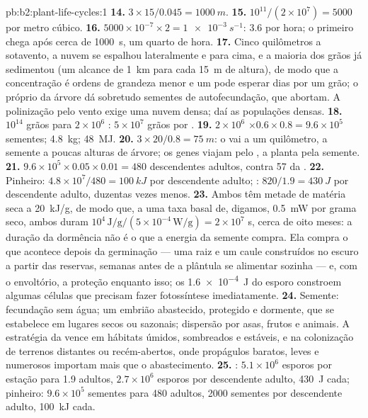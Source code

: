 \begin{solution}{pb:b2:plant-life-cycles:1}
\textbf{14.} $3\times 15/0.045 = \qty{1000}{m}$.
\textbf{15.} $10^{11}/(2\times 10^{7}) = \num{5000}$ por metro cúbico.
\textbf{16.} $5000\times 10^{-7}\times 2 = \qty{1e-3}{s^{-1}}$: 3.6 por
hora; o primeiro chega após cerca de \qty{1000}{s}, um quarto de hora.
\textbf{17.} Cinco quilômetros a sotavento, a nuvem se espalhou
lateralmente e para cima, e a maioria dos grãos já sedimentou (um
alcance de \qty{1}{km} para cada \qty{15}{m} de altura), de modo que a
concentração é ordens de grandeza menor e um  pode esperar dias
por um grão; o próprio  da árvore dá sobretudo sementes de
autofecundação, que abortam. A polinização pelo vento exige uma nuvem
densa; daí as populações densas.
\textbf{18.} $10^{14}$ grãos para $2\times 10^{6}$ : $5\times
10^{7}$ grãos por .
\textbf{19.} $2\times 10^{6}$  $\times 0.6\times 0.8 = 9.6\times
10^{5}$ sementes; \qty{4.8}{kg}; \qty{48}{MJ}.
\textbf{20.} $3\times 20/0.8 = \qty{75}{m}$: o  vai a um
quilômetro, a semente a poucas alturas de árvore; os genes viajam pelo
, a planta pela semente.
\textbf{21.} $9.6\times 10^{5}\times 0.05\times 0.01 = 480$ descendentes
adultos, contra 57 da .
\textbf{22.} Pinheiro: $4.8\times 10^{7}/480 = \qty{100}{kJ}$ por
descendente adulto; : $820/1.9 = \qty{430}{J}$ por
descendente adulto, duzentas vezes menos.
\textbf{23.} Ambos têm metade de matéria seca a \qty{20}{kJ/g}, de
modo que, a uma taxa basal de, digamos, \qty{0.5}{mW} por grama seco,
ambos duram $10^{4}\,
\text{J/g}/(5\times 10^{-4}\,\text{W/g}) = 2\times 10^{7}$ s, cerca de
oito meses: a duração da dormência não é o que a energia da semente
compra. Ela compra o que acontece depois da germinação --- uma raiz e
um caule construídos no escuro a partir das reservas, semanas antes de
a plântula se alimentar sozinha --- e, com o envoltório, a proteção
enquanto isso; os \qty{1.6e-4}{J} do esporo constroem algumas células
que precisam fazer fotossíntese imediatamente.
\textbf{24.} Semente: fecundação sem água; um embrião abastecido,
protegido e dormente, que se estabelece em lugares secos ou sazonais;
dispersão por asas, frutos e animais. A estratégia da  vence
em hábitats úmidos, sombreados e estáveis, e na colonização de
terrenos distantes ou recém-abertos, onde propágulos baratos, leves e
numerosos importam mais que o abastecimento.
\textbf{25.} : $5.1\times 10^{6}$ esporos por estação para 1.9
adultos, $2.7\times 10^{6}$ esporos por descendente adulto,
\qty{430}{J} cada; pinheiro: $9.6\times 10^{5}$ sementes para 480
adultos, \num{2000} sementes por descendente adulto, \qty{100}{kJ}
cada.
\end{solution}
